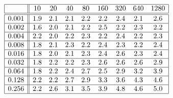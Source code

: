 \[
\begin{array}{|c||cccccccc|}
\hline 
& 10 & 20 & 40 & 80 & 160 & 320 & 640 & 1280\\
\hline \hline 
0.001 & 1.9 & 2.1 & 2.1 & 2.2 & 2.2 & 2.4 & 2.1 & 2.6 \\ \hline 
0.002 & 1.6 & 2.0 & 2.1 & 2.2 & 2.5 & 2.2 & 2.3 & 2.2 \\ \hline 
0.004 & 2.2 & 2.0 & 2.2 & 2.3 & 2.2 & 2.4 & 2.2 & 2.3 \\ \hline 
0.008 & 1.8 & 2.1 & 2.3 & 2.2 & 2.4 & 2.3 & 2.2 & 2.4 \\ \hline 
0.016 & 1.8 & 2.0 & 2.1 & 2.3 & 2.4 & 2.6 & 2.3 & 2.4 \\ \hline 
0.032 & 1.8 & 2.2 & 2.2 & 2.3 & 2.6 & 2.6 & 2.6 & 2.9 \\ \hline 
0.064 & 1.8 & 2.2 & 2.4 & 2.7 & 2.5 & 2.9 & 3.2 & 3.9 \\ \hline 
0.128 & 2.2 & 2.2 & 2.7 & 2.9 & 3.3 & 3.6 & 4.3 & 4.6 \\ \hline 
0.256 & 2.2 & 2.6 & 3.1 & 3.5 & 3.9 & 4.8 & 4.6 & 5.0 \\ \hline 
\end{array}
\]

